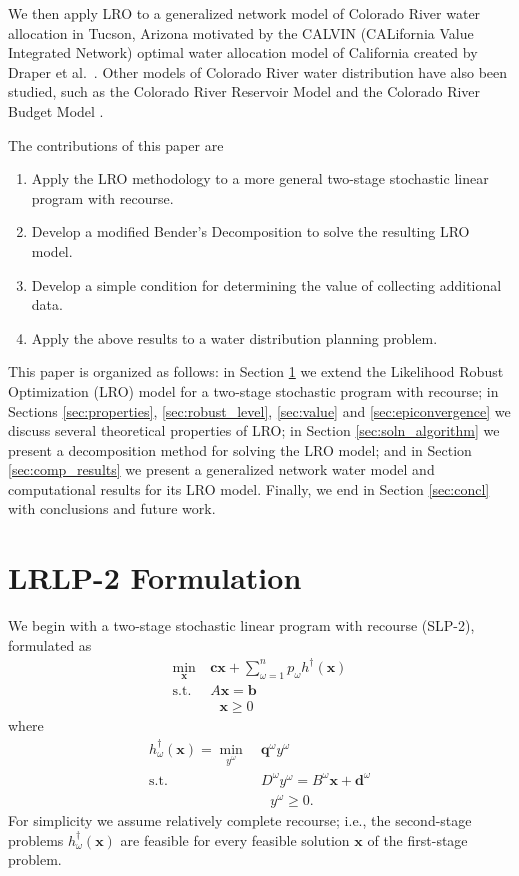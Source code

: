 \documentclass[11pt]{article}
\newcommand{\x}{\mathbf{x}}
\renewcommand{\c}{\mathbf{c}}
\newcommand{\q}{\mathbf{q}}
\renewcommand{\b}{\mathbf{b}}
\renewcommand{\d}{\mathbf{d}}
\newcommand{\st}{\mbox{s.t.}}
\begin{document}
We then apply LRO to a generalized network model of Colorado River water allocation in Tucson, Arizona motivated by the CALVIN (CALifornia Value Integrated Network) optimal water allocation model of California created by Draper et al.\ \cite{draper_etal_03}.
Other models of Colorado River water distribution have also been studied, such as the Colorado River Reservoir Model \cite{christensen2004effects} and the Colorado River Budget Model \cite{barnett2009sustainable}.

The contributions of this paper are
\begin{enumerate}
	\item Apply the LRO methodology to a more general two-stage stochastic linear program with recourse.
	\item Develop a modified Bender's Decomposition to solve the resulting LRO model.
	\item Develop a simple condition for determining the value of collecting additional data.
	\item Apply the above results to a water distribution planning problem.
\end{enumerate}

This paper is organized as follows: in Section \ref{sec:lrlp2} we extend the Likelihood Robust Optimization (LRO) model for a two-stage stochastic program with recourse; in Sections \ref{sec:properties}, \ref{sec:robust_level}, \ref{sec:value} and \ref{sec:epiconvergence} we discuss several theoretical properties of LRO; in Section \ref{sec:soln_algorithm} we present a decomposition method for solving the LRO model; and in Section \ref{sec:comp_results} we present a generalized network water model and computational results for its LRO model.
Finally, we end in Section \ref{sec:concl} with conclusions and future work.


\section{LRLP-2 Formulation}
\label{sec:lrlp2}

We begin with a two-stage stochastic linear program with recourse (SLP-2), formulated as
\begin{align}
	\min_\x \ & \c\x + \sum_{\omega=1}^n p_\omega h^\dagger(\x) \label{eq:slp_first_stage} \\
	\st \ & A\x = \b \nonumber  \\
	&\ \ \ \x \geq 0 \nonumber
\end{align}
where
\begin{align}
	h^\dagger_\omega(\x) = \min_{y^\omega} \ & \q^\omega y^\omega \label{eq:slp_second_stage} \\
	\st \ & D^\omega y^\omega = B^\omega \x + \d^\omega \nonumber \\
	& \ \ \ y^\omega \geq 0. \nonumber
\end{align}
For simplicity we assume relatively complete recourse; i.e., the second-stage problems $h^\dagger_\omega(\x)$ are feasible for every feasible solution $\x$ of the first-stage problem.
\end{document}
